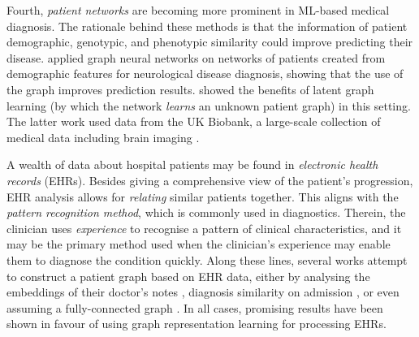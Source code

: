 Fourth, {\em patient networks} are becoming more prominent in ML-based medical diagnosis. The rationale behind these methods is that the information of patient demographic, genotypic, and phenotypic similarity could improve predicting their disease.  
%
 \cite{parisot2018disease} 
 applied graph neural networks on networks of patients created from demographic features for neurological disease diagnosis, showing that the use of the graph improves prediction results.
\cite{cosmo2020latent} showed the benefits of latent graph learning (by which the network {\em learns} an unknown patient graph) in this setting.  The latter work used data from the UK Biobank, a large-scale collection of medical data including brain imaging \citep{miller2016multimodal}. 




A wealth of data about hospital patients may be found in \emph{electronic health records} (EHRs). Besides giving a comprehensive view of the patient's progression, EHR analysis allows for \emph{relating} similar patients together. This aligns with the \emph{pattern recognition method}, which is commonly used in diagnostics. Therein, the clinician uses \emph{experience} to recognise a pattern of clinical characteristics, and it may be the primary method used when the clinician's experience may enable them to diagnose the condition quickly. Along these lines, several works attempt to construct a patient graph based on EHR data, either by analysing the embeddings of their doctor's notes \citep{malone2018learning}, diagnosis similarity on admission \citep{rocheteau2021predicting}, or even assuming a fully-connected graph \citep{zhu2019graph}. In all cases, promising results have been shown in favour of using graph representation learning for processing EHRs.



